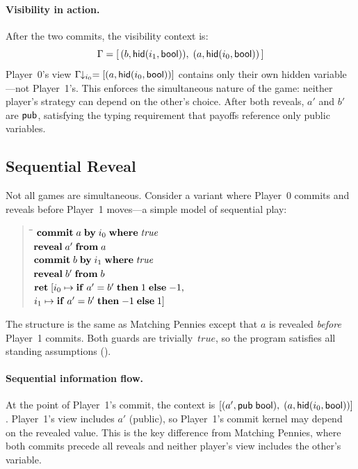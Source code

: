 \documentclass[11pt]{article}
\begin{document}
\paragraph{Visibility in action.}
After the two commits, the visibility context is:
\[
  \Gamma = [\,(b, \mathsf{hid}(i_{1}, \mathsf{bool})),\; (a, \mathsf{hid}(i_{0}, \mathsf{bool}))\,]
\]
Player~0's view $\Gamma\!\!\downarrow_{i_{0}} = [(a, \mathsf{hid}(i_{0}, \mathsf{bool}))]$
contains only their own hidden variable---not Player~1's. This enforces the
simultaneous nature of the game: neither player's strategy can depend on the
other's choice. After both reveals, $a'$ and $b'$ are $\mathsf{pub}$, satisfying
the typing requirement that payoffs reference only public variables.

\subsection{Sequential Reveal}

Not all games are simultaneous. Consider a variant where Player~0 commits
and reveals before Player~1 moves---a simple model of sequential play:
%
\begin{quote}
\begin{tabbing}
\qquad\= \qquad\= \kill
$\mathbf{commit}\;a\;\mathbf{by}\;i_{0}\;\mathbf{where}\;\mathit{true}$ \\
$\mathbf{reveal}\;a'\;\mathbf{from}\;a$ \\
$\mathbf{commit}\;b\;\mathbf{by}\;i_{1}\;\mathbf{where}\;\mathit{true}$ \\
$\mathbf{reveal}\;b'\;\mathbf{from}\;b$ \\
$\mathbf{ret}\;[i_{0} \mapsto \mathbf{if}\;a'=b'\;\mathbf{then}\;1\;\mathbf{else}\;{-1},$ \\
\> $i_{1} \mapsto \mathbf{if}\;a'=b'\;\mathbf{then}\;{-1}\;\mathbf{else}\;1]$
\end{tabbing}
\end{quote}
%
The structure is the same as Matching Pennies except that $a$ is revealed
\emph{before} Player~1 commits. Both guards are trivially~$\mathit{true}$,
so the program satisfies all standing assumptions ().

\paragraph{Sequential information flow.}
At the point of Player~1's commit, the context is
$[(a', \mathsf{pub}\;\mathsf{bool}),\; (a, \mathsf{hid}(i_{0}, \mathsf{bool}))]$. Player~1's view includes
$a'$ (public), so Player~1's commit kernel may depend on the revealed value.
This is the key difference from Matching Pennies, where both commits precede
all reveals and neither player's view includes the other's variable.
\end{document}
